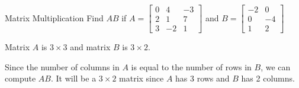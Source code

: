 \documentclass[t]{beamer}
\begin{document}
	\begin{frame}{Matrix Multiplication}
		Find $AB$ if $A = \begin{bmatrix}
		0 & 4 & -3 \\ 2 & 1 & 7 \\ 3 & -2 & 1
		\end{bmatrix}$ and $B = \begin{bmatrix}
		-2 & 0 \\ 0 & -4 \\ 1 & 2
		\end{bmatrix}$ \pause
		
		Matrix $A$ is $3\times 3$ and matrix $B$ is $3 \times 2$.
		
		Since the number of columns in $A$ is equal to the number of rows in $B$, we can compute $AB$. It will be a $3 \times 2$ matrix since $A$ has 3 rows and $B$ has 2 columns.
	\end{frame}
\end{document}
